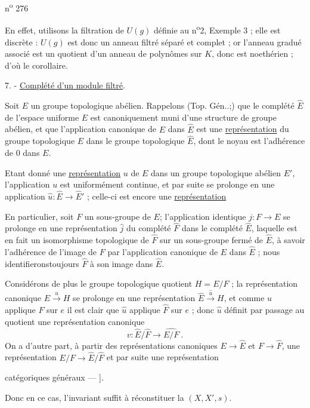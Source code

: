 n\textsuperscript{o} 276

En effet, utilisons la filtration de $U(g)$ définie au n\textsuperscript{o}2, Exemple 3 ; elle est discrète : $U(g)$ est donc un anneau filtré séparé et complet ; or l'anneau gradué associé est un quotient d'un anneau de polynômes sur $K$, donc est noethérien ; d'où le corollaire.

7. - \uline{Complété d'un module filtré}.

Soit $E$ un groupe topologique abélien. Rappelons (Top. Gén..;) que le complété $\hat E$ de l'espace uniforme $E$ est canoniquement muni d'une structure de groupe abélien, et que l'application canonique de $E$ dans $\hat E$ est une \uline{représentation} du groupe topologique $E$ dans le groupe topologique $\hat E$, dont le noyau est l'adhérence de $0$ dans $E$.

Etant donné une \uline{représentation} $u$ de $E$ dans un groupe topologique abélien $E'$, l'application $u$ est uniformément continue, et par suite se prolonge en une application $\hat u:\hat E\longrightarrow\hat E'$ ; celle-ci est encore une \uline{représentation}

En particulier, soit $F$ un sous-groupe de $E$; l'application identique $j:F\longrightarrow E$ se prolonge en une représentation $\hat j$ du complété $\hat F$ dans le complété $\hat E$, laquelle est en fait un isomorphisme topologique de $\hat F$ sur un sous-groupe fermé de $\hat E$, à savoir l'adhérence de l'image de $F$ par l'application canonique de $E$ dans $\hat E$ ; nous identifierons\handwritten{\textbar}toujours $\hat F$ à son image dans $\hat E$.

Considérons de plus le groupe topologique quotient $H=E/F$ ; la représentation canonique $E\xrightarrow{u}H$ se prolonge en une représentation $\hat E\xrightarrow{\hat u}H$, et comme $u$ applique $F$ sur $e$ il est clair que $\hat u$ applique $\hat F$ sur $e$ ; donc $\hat u$ définit par passage au quotient une représentation canonique
\[
v:\hat E/\hat F\longrightarrow\widehat{E/F}\ .
\]
On a d'autre part, à partir des représentations canoniques $E\longrightarrow\hat E$ et $F\longrightarrow\hat F$, une représentation $E/F\longrightarrow\hat E/\hat F$ et par suite une représentation

catégoriques généraux --- ].

Donc en ce cas, l'invariant suffit à réconstituer  la  $(X,X',s)$.

